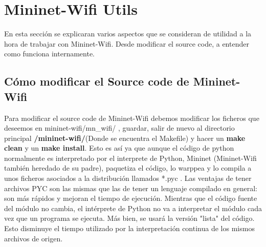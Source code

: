 \section{Mininet-Wifi Utils}
En esta sección se explicaran varios aspectos que se consideran de utilidad a la hora de trabajar con Mininet-Wifi. Desde modificar el source code, a entender como funciona internamente.

\subsection{Cómo modificar el Source code de Mininet-Wifi}
Para modificar el source code de Mininet-Wifi debemos modificar los ficheros que deseemos en mininet-wifi/mn\_wifi/ , guardar, salir de nuevo al directorio principal \textbf{/mininet-wifi/}(Donde se encuentra el Makefile) y hacer un \textbf{make clean} y un \textbf{make install}.\newline
\newline
Esto es así ya que aunque el código de python normalmente es interpretado por el interprete de Python, Mininet (Mininet-Wifi también heredado de su padre), paquetiza el código, lo warppea y lo compila a unos ficheros asociados a la distribución llamados *.pyc .\newline
\newline
Las ventajas de tener archivos PYC son las mismas que las de tener un lenguaje compilado en general: son más rápidos y mejoran el tiempo de ejecución. Mientras que el código fuente del módulo no cambia, el intérprete de Python no va a interpretar el módulo cada vez que un programa se ejecuta. Más bien, se usará la versión "lista" del código. Esto disminuye el tiempo utilizado por la interpretación continua de los mismos archivos de origen.
